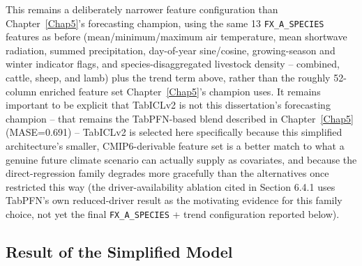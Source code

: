 This remains a deliberately narrower feature configuration than Chapter~\ref{Chap5}'s forecasting
champion, using the same 13 \texttt{FX\_A\_SPECIES} features as before (mean/minimum/maximum air
temperature, mean shortwave radiation, summed precipitation, day-of-year sine/cosine, growing-season
and winter indicator flags, and species-disaggregated livestock density -- combined, cattle, sheep,
and lamb) plus the trend term above, rather than the roughly 52-column enriched feature set
Chapter~\ref{Chap5}'s champion uses. It remains important to be explicit that TabICLv2 is not this
dissertation's forecasting champion -- that remains the TabPFN-based blend described in
Chapter~\ref{Chap5} (MASE=0.691) -- TabICLv2 is selected here specifically because this simplified
architecture's smaller, CMIP6-derivable feature set is a better match to what a genuine future
climate scenario can actually supply as covariates, and because the direct-regression family
degrades more gracefully than the alternatives once restricted this way (the driver-availability
ablation cited in Section 6.4.1 uses TabPFN's own reduced-driver result as the motivating evidence
for this family choice, not yet the final \texttt{FX\_A\_SPECIES} + trend configuration reported
below).

\subsection{Result of the Simplified Model}

\begin{table}[h]
\centering
{}
\caption{Cost of simplifying to a scenario-realistic feature set, TabICLv2 only. $R^2$ is not
reported for forecasting-style comparisons anywhere in this dissertation (Section 5.1.3).
\textsuperscript{\dag}Fertiliser-variable extension tested only against the superseded one-shot
architecture, not retested against the current engine.}
\end{table}

